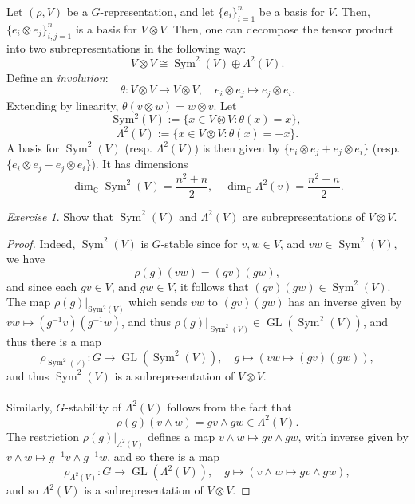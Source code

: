 \documentclass[a4paper]{report}
\theoremstyle{definition}
\theoremstyle{remark}
\theoremstyle{proposition}
\theoremstyle{conjecture}
\theoremstyle{lemma}
\theoremstyle{corollary}
\theoremstyle{exercise}
\newtheorem{exercise}{Exercise}
\theoremstyle{example}
\newcommand{\C}{\mathbb{C}}
\newcommand{\on}{\operatorname}
\begin{document}
Let $(\rho,V)$ be a $G$-representation, and let $\lbrace e_i\rbrace_{i=1}^n$
be a basis for $V$. Then, $\lbrace e_i\otimes e_j\rbrace_{i,j=1}^n$ is a
basis for $V\otimes V$. Then, one can decompose the tensor product 
into two subrepresentations in the following way: 
$$V\otimes V \cong \on{Sym}^2(V) \oplus \Lambda^2(V).$$
Define an \emph{involution}:
$$\theta : V\otimes V \longrightarrow V\otimes V, \quad e_i\otimes e_j \longmapsto e_j \otimes e_i.$$
Extending by linearity, $\theta(v\otimes w) = w\otimes v$. 
Let $$\on{Sym^2}(V) := \lbrace x \in V\otimes V : \theta(x) = x\rbrace,$$
$$\Lambda^2(V) := \lbrace x \in V\otimes V : \theta(x) = -x\rbrace.$$
A basis for $\on{Sym}^2(V)$ (resp. $\Lambda^2(V)$) is then given by $\lbrace e_i\otimes e_j + e_j \otimes e_i\rbrace$  (resp. $\lbrace e_i\otimes e_j - e_j\otimes e_i\rbrace$). It has dimensions 
$$\dim_\C \on{Sym}^2(V) = \frac{n^2+n}{2},\quad \dim_\C\Lambda^2(v) = \frac{n^2-n}{2}.$$
\begin{exercise}
    Show that $\on{Sym}^2(V)$ and $\Lambda^2(V)$ are subrepresentations of 
    $V\otimes V$. 
\end{exercise}

\begin{proof}
    Indeed, $\on{Sym}^2(V)$ is $G$-stable since for $v,w \in V$, and 
    $vw \in \on{Sym}^2(V)$, we have 
    $$\rho(g)(vw) = (gv)(gw),$$
    and since each $gv \in V$, and $gw\in V$, it follows that 
    $(gv)(gw) \in\on{Sym}^2(V)$. The map 
    $\rho(g)\vert_{\on{Sym^2}(V)}$ which sends $vw$ to $(gv)(gw)$ has an 
    inverse given by $vw \mapsto (g^{-1}v)(g^{-1}w)$, and thus 
    $\rho(g)\vert_{\on{Sym}^2(V)} \in \on{GL}(\on{Sym}^2(V))$, and thus 
    there is a map 
    $$\rho_{\on{Sym}^2(V)} : G \longrightarrow \on{GL}(\on{Sym}^2(V)),\quad 
    g\longmapsto (vw \longmapsto (gv)(gw)),$$
    and thus $\on{Sym}^2(V)$ is a subrepresentation of $V\otimes V$.\\\\
    Similarly, $G$-stability of $\Lambda^2(V)$ follows from the fact that 
    $$\rho(g)(v\wedge w) = gv \wedge gw \in \Lambda^2(V).$$
    The restriction $\rho(g)\vert_{\Lambda^2(V)}$ defines a map 
    $v\wedge w \mapsto gv\wedge gw$, with inverse given by 
    $v\wedge w\mapsto g^{-1}v\wedge g^{-1}w$, and so 
    there is a map $$\rho_{\Lambda^2(V)} : G \longrightarrow \on{GL}(\Lambda^2(V)), \quad g\longmapsto (v\wedge w \longmapsto gv\wedge gw),$$
    and so $\Lambda^2(V)$ is a subrepresentation of $V\otimes V$.
\end{proof}
\end{document}

